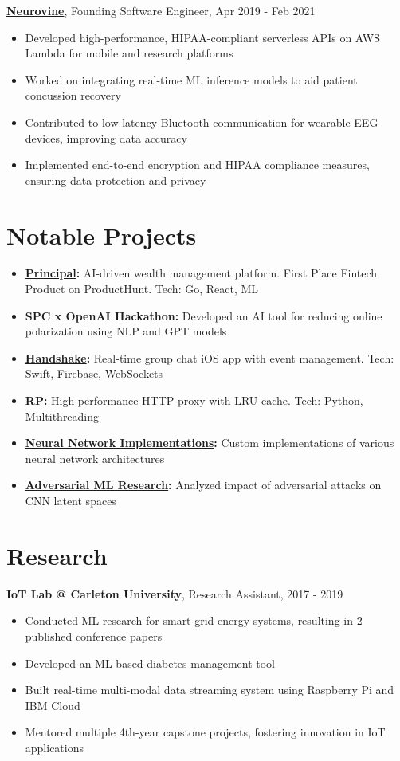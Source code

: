 \documentclass[9pt]{article}
\begin{document}
\noindent
\textbf{\href{https://neurovine.ai}{Neurovine}}, Founding Software Engineer, Apr 2019 - Feb 2021
\begin{itemize}
    \setlength\itemsep{0em}
    \item Developed high-performance, HIPAA-compliant serverless APIs on AWS Lambda for mobile and research platforms
    \item Worked on integrating real-time ML inference models to aid patient concussion recovery
    \item Contributed to low-latency Bluetooth communication for wearable EEG devices, improving data accuracy
    \item Implemented end-to-end encryption and HIPAA compliance measures, ensuring data protection and privacy
\end{itemize}

\section*{Notable Projects}

\begin{itemize}
    \setlength\itemsep{0em}
    \item \textbf{\href{https://withprincipal.com}{Principal}:} AI-driven wealth management platform. First Place Fintech Product on ProductHunt. Tech: Go, React, ML
    \item \textbf{SPC x OpenAI Hackathon:} Developed an AI tool for reducing online polarization using NLP and GPT models
    \item \textbf{\href{https://github.com/boshd/handshake}{Handshake}:} Real-time group chat iOS app with event management. Tech: Swift, Firebase, WebSockets
    \item \textbf{\href{https://github.com/boshd/rp}{RP}:} High-performance HTTP proxy with LRU cache. Tech: Python, Multithreading
    \item \textbf{\href{https://github.com/boshd/neuralnets}{Neural Network Implementations}:} Custom implementations of various neural network architectures
    \item \textbf{\href{https://github.com/boshd/advatck}{Adversarial ML Research}:} Analyzed impact of adversarial attacks on CNN latent spaces
\end{itemize}

\section*{Research}
\textbf{IoT Lab @ Carleton University}, Research Assistant, 2017 - 2019
\begin{itemize}
    \setlength\itemsep{0em}
    \item Conducted ML research for smart grid energy systems, resulting in 2 published conference papers
    \item Developed an ML-based diabetes management tool
    \item Built real-time multi-modal data streaming system using Raspberry Pi and IBM Cloud
    \item Mentored multiple 4th-year capstone projects, fostering innovation in IoT applications
\end{itemize}
\end{document}

